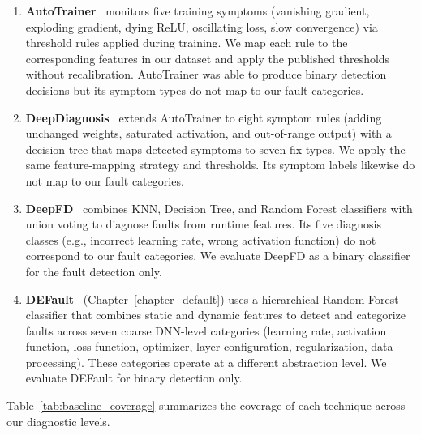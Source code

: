 \begin{enumerate}[label=(\roman*),nosep]
\item \textbf{AutoTrainer}~\cite{autotrainer} monitors five training symptoms (vanishing gradient, exploding gradient, dying ReLU, oscillating loss, slow convergence) via threshold rules applied during training. We map each rule to the corresponding features in our dataset and apply the published thresholds without recalibration. AutoTrainer was able to produce binary detection decisions but its symptom types do not map to our fault categories.

\item \textbf{DeepDiagnosis}~\cite{deepdiagnosis} extends AutoTrainer to eight symptom rules (adding unchanged weights, saturated activation, and out-of-range output) with a decision tree that maps detected symptoms to seven fix types. We apply the same feature-mapping strategy and thresholds. Its symptom labels likewise do not map to our fault categories.

\item \textbf{DeepFD}~\cite{deepfd} combines KNN, Decision Tree, and Random Forest classifiers with union voting to diagnose faults from runtime features. Its five diagnosis classes (e.g., incorrect learning rate, wrong activation function) do not correspond to our fault categories. We evaluate DeepFD as a binary classifier for the fault detection only.

\item \textbf{DEFault}~\cite{default} (Chapter~\ref{chapter_default}) uses a hierarchical Random Forest classifier that combines static and dynamic features to detect and categorize faults across seven coarse DNN-level categories (learning rate, activation function, loss function, optimizer, layer configuration, regularization, data processing). These categories operate at a different abstraction level. We evaluate DEFault for binary detection only.
\end{enumerate}

Table~\ref{tab:baseline_coverage} summarizes the coverage of each technique across our diagnostic levels.

